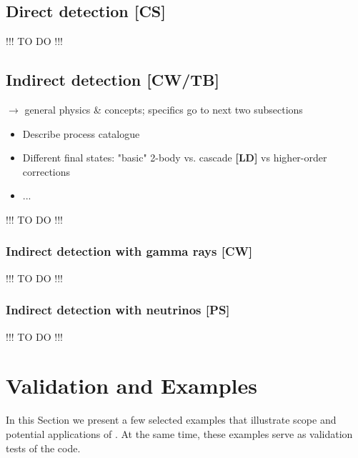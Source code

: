 \subsection{Direct detection {\bf [CS]}}
\label{code_dd}
\smallskip
{\color{red} !!! TO DO !!!}
\smallskip



\subsection{Indirect detection {\bf [CW/TB]}}
\label{code_id}

$\to$ general physics \& concepts; specifics go to next two subsections
\begin{itemize}
\item Describe process catalogue 
\item Different final states: "basic" 2-body vs. cascade {\bf [LD]} vs higher-order corrections
\item...
\end{itemize}
\smallskip
{\color{red} !!! TO DO !!!}
\smallskip


\subsubsection{Indirect detection with gamma rays {\bf [CW]}}
\label{code_ga}
\smallskip
{\color{red} !!! TO DO !!!}
\smallskip


\subsubsection{Indirect detection with neutrinos {\bf [PS]}}
\label{code_nu}
\smallskip
{\color{red} !!! TO DO !!!}
\smallskip




\section{Validation and  Examples}
\label{examples}

In this Section we present a few selected  examples that illustrate scope and
potential applications of \DB. At the same time, these examples serve as validation
tests of the code.


